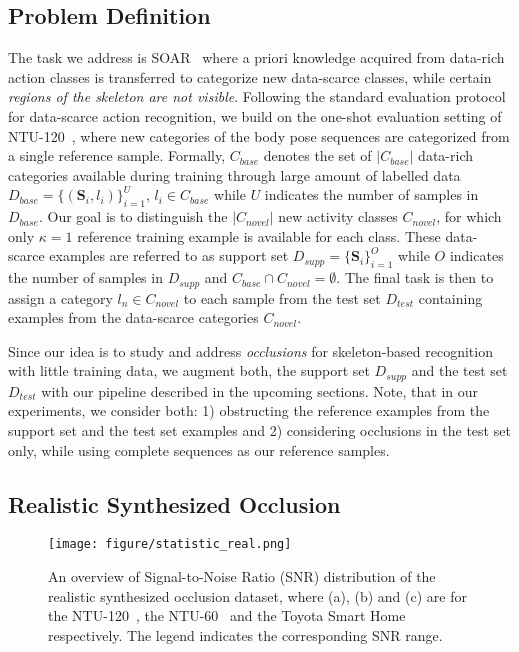\documentclass[lettersize,journal]{IEEEtran}
\begin{document}
\subsection{Problem Definition}
\label{sec:problem}
The task we address is SOAR~\cite{memmesheimer2020skeleton_dml} where a priori knowledge acquired from data-rich action classes is transferred to categorize new data-scarce classes, while certain \textit{regions of the skeleton are not visible}.
Following the standard evaluation protocol for data-scarce action recognition, we build on the one-shot evaluation setting of  NTU-120~\cite{liu2019ntu}, where new categories of the body pose sequences are categorized from a single reference sample.
Formally, $C_{base}$ denotes the set of $|C_{base}|$ data-rich categories available during training through large amount of labelled data $D_{base} = \{(\mathbf{S}_i, l_i)\}_{i=1}^{U}$, $l_i\in C_{base}$ while $U$ indicates the number of samples in $D_{base}$.
Our goal is to distinguish the $|C_{novel}|$ new activity classes $C_{novel}$, for which only $\kappa = 1$ reference training example is available for each class.
These data-scarce examples are referred to as support set $D_{supp} = \{\mathbf{S}_i\}_{i = 1}^{O}$ while $O$ indicates the number of samples in $D_{supp}$ and $C_{base}\cap C_{novel} = \emptyset$.
The final task is then to assign a category $l_n\in C_{novel}$ to each sample from the test set $D_{test}$ containing examples from the data-scarce categories $C_{novel}$.

Since our idea is to study and address \textit{occlusions} for skeleton-based recognition with little training data, we augment both, the support set $D_{supp}$ and the test set $D_{test}$ with our pipeline described in the upcoming sections. 
Note, that in our experiments, we consider both: 1) obstructing the reference examples from the support set and the test set examples and 2) considering occlusions in the test set only, while using complete sequences as our reference samples.

\subsection{Realistic Synthesized Occlusion}
\label{benchmark:realistic}

\begin{figure}[t]
\begin{center}
\texttt{[image: figure/statistic\_real.png]}
\end{center}
\caption{An overview of Signal-to-Noise Ratio (SNR) distribution of the realistic synthesized occlusion dataset, where (a), (b) and (c) are for the NTU-120~\cite{liu2019ntu}, the NTU-60~\cite{shahroudy2016ntu} and the Toyota Smart Home~\cite{Das_2019_ICCV} respectively. The legend indicates the corresponding SNR range.
}
\label{fig:statistic_synthesized}
\end{figure}
\end{document}
